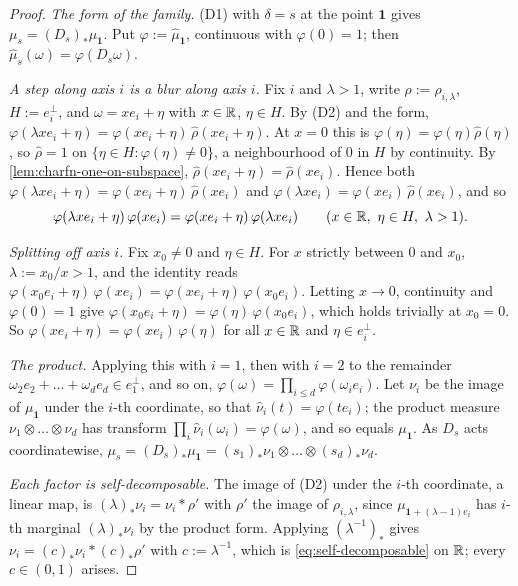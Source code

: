 \begin{proof}
\leanok
\emph{The form of the family.} (D1) with $\delta = s$ at the point $\mathbf 1$ gives
$\mu_s = (D_s)_*\mu_{\mathbf 1}$. Put $\varphi := \widehat\mu_{\mathbf 1}$, continuous with
$\varphi(0) = 1$; then $\widehat\mu_s(\omega) = \varphi(D_s\omega)$.

\emph{A step along axis $i$ is a blur along axis $i$.} Fix $i$ and $\lambda > 1$, write
$\rho := \rho_{i,\lambda}$, $H := e_i^\perp$, and $\omega = xe_i + \eta$ with $x \in \mathbb{R}$,
$\eta \in H$. By (D2) and the form, $\varphi(\lambda xe_i + \eta) = \varphi(xe_i + \eta)\,
\widehat\rho(xe_i + \eta)$. At $x = 0$ this is $\varphi(\eta) = \varphi(\eta)\widehat\rho(\eta)$,
so $\widehat\rho = 1$ on $\{\eta \in H : \varphi(\eta) \ne 0\}$, a neighbourhood of $0$ in $H$ by
continuity. By \ref{lem:charfn-one-on-subspace}, $\widehat\rho(xe_i + \eta) = \widehat\rho(xe_i)$.
Hence both $\varphi(\lambda xe_i + \eta) = \varphi(xe_i + \eta)\,\widehat\rho(xe_i)$ and
$\varphi(\lambda xe_i) = \varphi(xe_i)\,\widehat\rho(xe_i)$, and so
\[
  \varphi(\lambda xe_i + \eta)\,\varphi(xe_i) = \varphi(xe_i + \eta)\,\varphi(\lambda xe_i)
  \qquad (x \in \mathbb{R},\ \eta \in H,\ \lambda > 1).
\]

\emph{Splitting off axis $i$.} Fix $x_0 \ne 0$ and $\eta \in H$. For $x$ strictly between $0$ and
$x_0$, $\lambda := x_0/x > 1$, and the identity reads
$\varphi(x_0e_i + \eta)\,\varphi(xe_i) = \varphi(xe_i + \eta)\,\varphi(x_0e_i)$. Letting $x \to 0$,
continuity and $\varphi(0) = 1$ give $\varphi(x_0e_i + \eta) = \varphi(\eta)\,\varphi(x_0e_i)$,
which holds trivially at $x_0 = 0$. So $\varphi(xe_i + \eta) = \varphi(xe_i)\,\varphi(\eta)$ for
all $x \in \mathbb{R}$ and $\eta \in e_i^\perp$.

\emph{The product.} Applying this with $i = 1$, then with $i = 2$ to the remainder
$\omega_2e_2 + \dots + \omega_de_d \in e_1^\perp$, and so on,
$\varphi(\omega) = \prod_{i\le d}\varphi(\omega_ie_i)$. Let $\nu_i$ be the image of
$\mu_{\mathbf 1}$ under the $i$-th coordinate, so that $\widehat\nu_i(t) = \varphi(te_i)$; the
product measure $\nu_1 \otimes \dots \otimes \nu_d$ has transform $\prod_i\widehat\nu_i(\omega_i)
= \varphi(\omega)$, and so equals $\mu_{\mathbf 1}$. As $D_s$ acts coordinatewise,
$\mu_s = (D_s)_*\mu_{\mathbf 1} = (s_1)_*\nu_1 \otimes \dots \otimes (s_d)_*\nu_d$.

\emph{Each factor is self-decomposable.} The image of (D2) under the $i$-th coordinate, a linear
map, is $(\lambda)_*\nu_i = \nu_i * \rho'$ with $\rho'$ the image of $\rho_{i,\lambda}$, since
$\mu_{\mathbf 1 + (\lambda-1)e_i}$ has $i$-th marginal $(\lambda)_*\nu_i$ by the product form.
Applying $(\lambda^{-1})_*$ gives $\nu_i = (c)_*\nu_i * (c)_*\rho'$ with $c := \lambda^{-1}$,
which is \ref{eq:self-decomposable} on $\mathbb{R}$; every $c \in (0,1)$ arises.


\end{proof}
